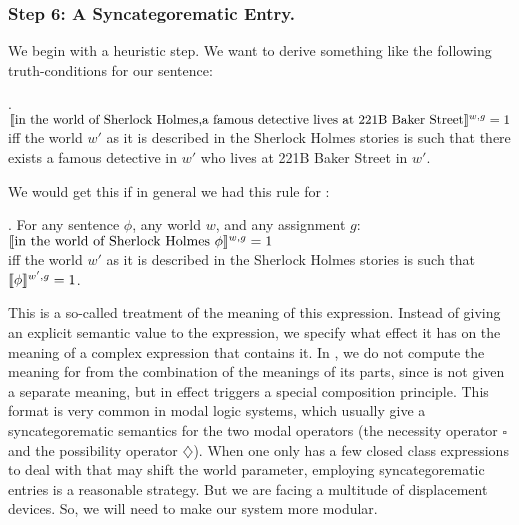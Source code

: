 \subsubsection{Step 6: A Syncategorematic Entry.} \label{sec:sync-entry}

We begin with a heuristic step. We want to derive something like the
following truth-conditions for our sentence:

\ex. $\llbracket \mbox{in the world of Sherlock Holmes,}\\
\mbox{a famous detective lives at 221B Baker Street} \rrbracket^{w,g} = 1$\\
iff the world $w'$ as it is described in the Sherlock Holmes stories is such that there exists a famous detective in $w'$ who lives at 221B Baker Street in $w'$.

We would get this if in general we had this rule for :

\ex. For any sentence $\phi$, any world $w$, and any assignment $g$:\\
$\llbracket \mbox{in the world of Sherlock Holmes }\phi \rrbracket^{w,g} = 1$\\
iff the world $w'$ as it is described in the Sherlock Holmes stories is such that $\llbracket \phi \rrbracket^{w',g} = 1$.

This is a so-called  treatment of the meaning
of this expression. Instead of giving an explicit semantic value to
the expression, we specify what effect it has on the meaning of a
complex expression that contains it. In \Last, we do not compute the
meaning for  from
the combination of the meanings of its parts, since  is not given a separate meaning, but in
effect triggers a special composition principle. This %
%
format is very common in modal logic systems, which usually give a
syncategorematic semantics for the two modal operators (the necessity
operator $\square$ and the possibility operator $\diamondsuit$). When
one only has a few closed class expressions to deal with that may
shift the world parameter, employing syncategorematic entries is a
reasonable strategy. But we are facing a multitude of displacement
devices. So, we will need to make our system more modular.

